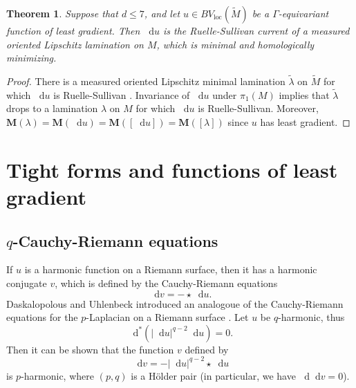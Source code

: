 \documentclass[reqno,11pt]{amsart}
\newcommand*\dif{\mathop{}\!\mathrm{d}}
\newcommand{\Mass}{\mathbf M}
\newcommand{\loc}{\mathrm{loc}}
\newtheorem{theorem}{Theorem}[section]
\theoremstyle{definition}
\numberwithin{equation}{section}
\begin{document}
\begin{theorem}\label{1 harmonic is MOML}
Suppose that $d \leq 7$, and let $u \in BV_\loc(\tilde M)$ be a $\Gamma$-equivariant function of least gradient.
Then $\dif u$ is the Ruelle-Sullivan current of a measured oriented Lipschitz lamination on $M$, which is minimal and homologically minimizing.
\end{theorem}
\begin{proof}
There is a measured oriented Lipschitz minimal lamination $\tilde \lambda$ on $\tilde M$ for which $\dif u$ is Ruelle-Sullivan \cite[Theorem B]{BackusCML}.
Invariance of $\dif u$ under $\pi_1(M)$ implies that $\tilde \lambda$ drops to a lamination $\lambda$ on $M$ for which $\dif u$ is Ruelle-Sullivan.
Moreover, $\Mass(\lambda) = \Mass(\dif u) = \Mass([\dif u]) = \Mass([\lambda])$ since $u$ has least gradient.
\end{proof}


\section{Tight forms and functions of least gradient}\label{tight forms sec}
\subsection{\texorpdfstring{$q$-Cauchy-Riemann}{q-Cauchy-Riemann} equations}
If $u$ is a harmonic function on a Riemann surface, then it has a harmonic conjugate $v$, which is defined by the Cauchy-Riemann equations 
$$\dif v = -\star \dif u.$$
Daskalopolous and Uhlenbeck introduced an analogoue of the Cauchy-Riemann equations for the $p$-Laplacian on a Riemann surface \cite[\S3]{daskalopoulos2020transverse}.
Let $u$ be $q$-harmonic, thus 
$$\dif^*(|\dif u|^{q - 2} \dif u) = 0.$$
Then it can be shown that the function $v$ defined by 
$$\dif v = -|\dif u|^{q - 2} \star \dif u$$
is $p$-harmonic, where $(p, q)$ is a H\"older pair (in particular, we have $\dif \dif v = 0$).
\end{document}

